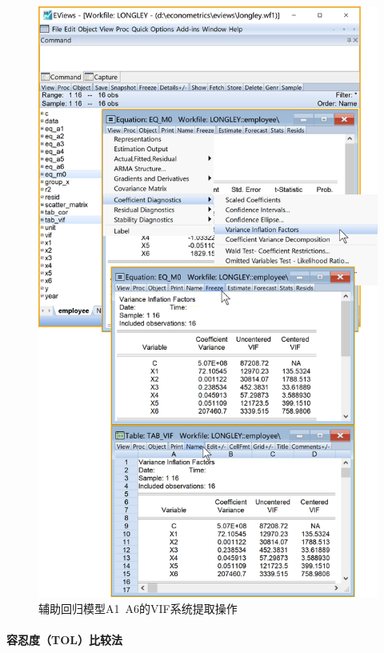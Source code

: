 \documentclass[12pt,(landscape,a4paper),(portrait,a4paper)]{article}
\let\oldparagraph\paragraph
\renewcommand{\paragraph}[1]{\oldparagraph{#1}\mbox{}}
\begin{document}
\begin{figure}

{\centering \includegraphics[width=8in]{picture/lab5-multilinearity/3-tab-VIF} 

}

\caption{辅助回归模型A1~A6的VIF系统提取操作}\label{fig:fig-tab-VIF}
\end{figure}

\hypertarget{tol}{%
\paragraph{容忍度（TOL）比较法}\label{tol}}
\end{document}
